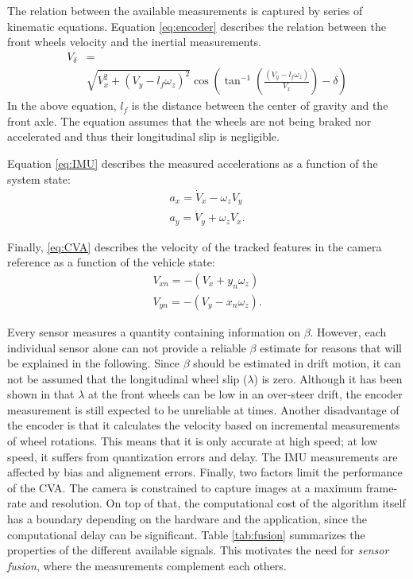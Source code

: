 \documentclass[letterpaper, 10 pt, conference]{ieeeconf}
\begin{document}
The relation between the available measurements is captured by series of kinematic equations. Equation \eqref{eq:encoder} describes the relation between the front wheels velocity  and the inertial measurements.
\begin{align} 
{V_{\delta}} & =  \label{eq:encoder}  \\
& \sqrt {V_x^2 + {{\left( {{V_y} - {l_f}{\omega _z}} \right)}^2}}  \cos \left( {{{\tan }^{ - 1}}\left( {\frac{{\left( {{V_y} - {l_f}{\omega _z}} \right)}}{{{V_x}}}} \right) - \delta } \right)
 \nonumber
\end{align}
In the above equation, $l_f$ is the distance between the center of gravity and the front axle. The equation assumes that the wheels are not being braked nor accelerated and thus their longitudinal slip is negligible.

Equation \eqref{eq:IMU} describes the measured accelerations as a function of the system state:
\begin{equation}
\begin{array}{l}
{a_x} = {\dot V_x} - {\omega _z}{V_y} \\
{a_y} = {\dot V_y} + {\omega _z}{V_x}.
\end{array}
\label{eq:IMU}
\end{equation}

Finally, \eqref{eq:CVA} describes the velocity of the tracked features in the camera reference as a function of the vehicle state:
\begin{equation}
\begin{array}{l}
{V_{xn}} =  - \left( {{V_x} + {y_n}{\omega _z}} \right)  \\ 
{V_{yn}} =  - \left( {{V_y} - {x_n}{\omega _z}} \right).
\end{array}
\label{eq:CVA}
\end{equation}

Every sensor measures a quantity containing information on $\beta$. However, each individual sensor alone can not provide a reliable $\beta$ estimate for reasons that will be explained in the following. Since $\beta$ should be estimated in drift motion, it can not be assumed that the longitudinal wheel slip ($\lambda$) is zero. Although it has been shown in \cite{werling2015robust} that $\lambda$ at the front wheels can be low in an over-steer drift, the encoder measurement is still expected to be unreliable at times. Another disadvantage of the encoder is that it calculates the velocity based on incremental measurements of wheel rotations. This means that it is only accurate at high speed; at low speed, it suffers from quantization errors and delay. The IMU measurements are affected by bias and alignement errors. Finally, two factors limit the performance of the CVA. The camera is constrained to capture images at a maximum frame-rate and resolution. On top of that, the computational cost of the algorithm itself has a boundary depending on the hardware and the application, since the computational delay can be significant. Table \ref{tab:fusion} summarizes the properties of the different available signals.  This motivates the need for \emph{sensor fusion}, where the measurements complement each others.
\end{document}
